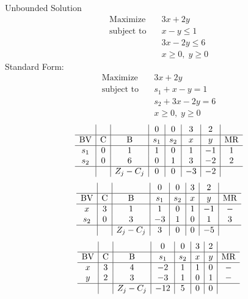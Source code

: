 \documentclass{article}
\begin{document}
Unbounded Solution\\
\begin{align*}
\text{Maximize} \quad & 3x + 2y\\
\text{subject to} \quad
& x - y\le1\\
& 3x - 2y\le6\\
& x\ge0,\; y\ge0\end{align*}
Standard Form:\\
\begin{align*}
\text{Maximize} \quad & 3x + 2y\\
\text{subject to} \quad
& s_{1} + x - y=1\\
& s_{2} + 3x - 2y=6\\
& x\ge0,\; y\ge0\end{align*}
\begin{align*}
\begin{array}{c|c|c|c|c|c|c|c}
 &  &  & 0 & 0 & 3 & 2 & \\
\hline
\text{BV} & \text{C} & \text{B} & s_{1} & s_{2} & x & y & \text{MR} \\
\hline
s_{1} & 0 & 1 & 1 & 0 & 1 & -1 & 1 \\
s_{2} & 0 & 6 & 0 & 1 & 3 & -2 & 2 \\
\hline
 &  & Z_j-C_j & 0 & 0 & -3 & -2 & \\
\end{array}
\end{align*}
\begin{align*}
\begin{array}{c|c|c|c|c|c|c|c}
 &  &  & 0 & 0 & 3 & 2 & \\
\hline
\text{BV} & \text{C} & \text{B} & s_{1} & s_{2} & x & y & \text{MR} \\
\hline
x & 3 & 1 & 1 & 0 & 1 & -1 & - \\
s_{2} & 0 & 3 & -3 & 1 & 0 & 1 & 3 \\
\hline
 &  & Z_j-C_j & 3 & 0 & 0 & -5 & \\
\end{array}
\end{align*}
\begin{align*}
\begin{array}{c|c|c|c|c|c|c|c}
 &  &  & 0 & 0 & 3 & 2 & \\
\hline
\text{BV} & \text{C} & \text{B} & s_{1} & s_{2} & x & y & \text{MR} \\
\hline
x & 3 & 4 & -2 & 1 & 1 & 0 & - \\
y & 2 & 3 & -3 & 1 & 0 & 1 & - \\
\hline
 &  & Z_j-C_j & -12 & 5 & 0 & 0 & \\
\end{array}
\end{align*}
\end{document}
